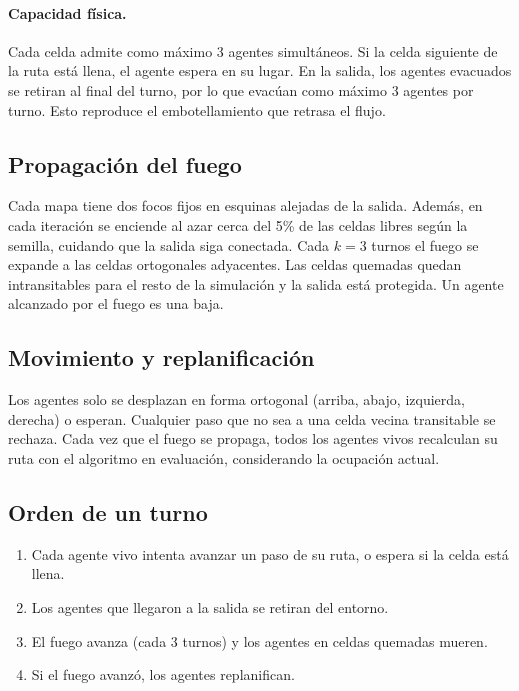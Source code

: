 \documentclass[11pt,a4paper]{article}
\begin{document}
\paragraph{Capacidad física.} Cada celda admite como máximo 3 agentes simultáneos. Si la celda siguiente de la ruta está llena, el agente espera en su lugar. En la salida, los agentes evacuados se retiran al final del turno, por lo que evacúan como máximo 3 agentes por turno. Esto reproduce el embotellamiento que retrasa el flujo.

\subsection{Propagación del fuego}

Cada mapa tiene dos focos fijos en esquinas alejadas de la salida. Además, en cada iteración se enciende al azar cerca del 5\% de las celdas libres según la semilla, cuidando que la salida siga conectada. Cada $k=3$ turnos el fuego se expande a las celdas ortogonales adyacentes. Las celdas quemadas quedan intransitables para el resto de la simulación y la salida está protegida. Un agente alcanzado por el fuego es una baja.

\subsection{Movimiento y replanificación}

Los agentes solo se desplazan en forma ortogonal (arriba, abajo, izquierda, derecha) o esperan. Cualquier paso que no sea a una celda vecina transitable se rechaza. Cada vez que el fuego se propaga, todos los agentes vivos recalculan su ruta con el algoritmo en evaluación, considerando la ocupación actual.

\subsection{Orden de un turno}

\begin{enumerate}
  \item Cada agente vivo intenta avanzar un paso de su ruta, o espera si la celda está llena.
  \item Los agentes que llegaron a la salida se retiran del entorno.
  \item El fuego avanza (cada 3 turnos) y los agentes en celdas quemadas mueren.
  \item Si el fuego avanzó, los agentes replanifican.
\end{enumerate}
\end{document}
